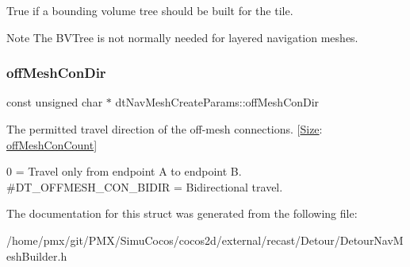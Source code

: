 True if a bounding volume tree should be built for the tile. \begin{DoxyNote}{Note}
The B\+V\+Tree is not normally needed for layered navigation meshes. 
\end{DoxyNote}
\mbox{\label{structdtNavMeshCreateParams_a44a34e3c48ec498c7a84d01c2766000f}} 
\subsubsection{\texorpdfstring{off\+Mesh\+Con\+Dir}{offMeshConDir}}
{\footnotesize\ttfamily const unsigned char $\ast$ dt\+Nav\+Mesh\+Create\+Params\+::off\+Mesh\+Con\+Dir}

The permitted travel direction of the off-\/mesh connections. \mbox{[}\hyperlink{classSize}{Size}\+: \hyperlink{structdtNavMeshCreateParams_adf244929dceba81df29f80f8869097c0}{off\+Mesh\+Con\+Count}\mbox{]}

0 = Travel only from endpoint A to endpoint B.~\newline
 \#\+D\+T\+\_\+\+O\+F\+F\+M\+E\+S\+H\+\_\+\+C\+O\+N\+\_\+\+B\+I\+D\+IR = Bidirectional travel. 

The documentation for this struct was generated from the following file\+:\begin{DoxyCompactItemize}
\item 
/home/pmx/git/\+P\+M\+X/\+Simu\+Cocos/cocos2d/external/recast/\+Detour/Detour\+Nav\+Mesh\+Builder.\+h\end{DoxyCompactItemize}
